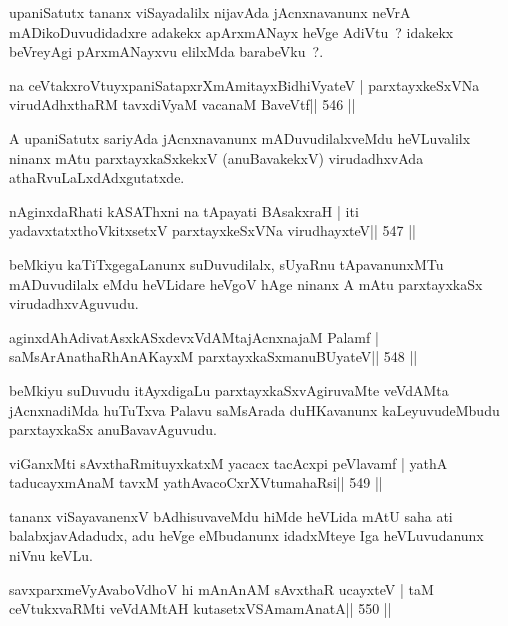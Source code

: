 \begin{artha}
upaniSatutx tananx viSayadalilx nijavAda jAcnxnavanunx neVrA mADikoDuvudidadxre adakekx apArxmANayx heVge AdiVtu~? idakekx beVreyAgi pArxmANayxvu elilxMda barabeVku~?.
\end{artha}

\begin{shl}
na ceVtakxroVtuyxpaniSatapxrXmAmitayxBidhiVyateV |
parxtayxkeSxVNa virudAdhxthaRM tavxdiVyaM vacanaM BaveVtf\hfill || 546 ||
\end{shl}

\begin{artha}
A upaniSatutx sariyAda jAcnxnavanunx mADuvudilalxveMdu heVLuvalilx ninanx mAtu parxtayxkaSxkekxV (anuBavakekxV) virudadhxvAda athaRvuLaLxdAdxgutatxde.
\end{artha}

\begin{shl}
nAginxdaRhati kASAThxni na tApayati BAsakxraH |
iti yadavxtatxthoVkitxsetxV parxtayxkeSxVNa virudhayxteV\hfill || 547 ||
\end{shl}

\begin{artha}
beMkiyu kaTiTxgegaLanunx suDuvudilalx, sUyaRnu tApavanunxMTu mADuvudilalx eMdu heVLidare heVgoV hAge ninanx A mAtu parxtayxkaSx virudadhxvAguvudu.
\end{artha}

\begin{shl}
aginxdAhAdivatAsxkASxdevxVdAMtajAcnxnajaM Palamf |
saMsArAnathaRhAnAKayxM parxtayxkaSxmanuBUyateV\hfill || 548 ||
\end{shl}

\begin{artha}
beMkiyu suDuvudu itAyxdigaLu parxtayxkaSxvAgiruvaMte veVdAMta jAcnxnadiMda huTuTxva Palavu saMsArada duHKavanunx kaLeyuvudeMbudu parxtayxkaSx anuBavavAguvudu.
\end{artha}

\begin{shl}
viGanxMti sAvxthaRmituyxkatxM yacacx tacAcxpi peVlavamf |
yathA taducayxmAnaM tavxM yathAvacoCxrXVtumahaRsi\hfill || 549 ||
\end{shl}

\begin{artha}
tananx viSayavanenxV bAdhisuvaveMdu hiMde heVLida mAtU saha ati
balabxjavAdadudx, adu heVge eMbudanunx idadxMteye Iga heVLuvudanunx
niVnu keVLu.
\end{artha}

\begin{shl}
savxparxmeVyAvaboVdhoV hi mAnAnAM sAvxthaR ucayxteV |
taM ceVtukxvaRMti veVdAMtAH kutasetxVSAmamAnatA\hfill || 550 ||
\end{shl}

